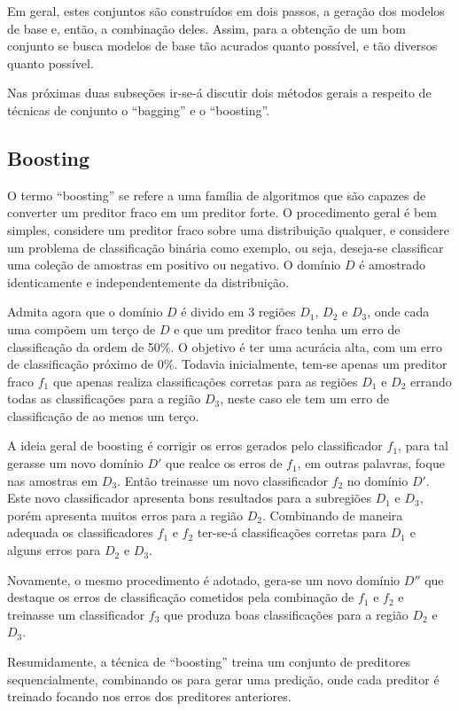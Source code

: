 Em geral, estes conjuntos são construídos em dois passos, a geração dos modelos de base e, então, a combinação deles. Assim, para a obtenção de um bom conjunto se busca modelos de base tão acurados quanto possível, e tão diversos quanto possível.

Nas próximas duas subseções ir-se-á discutir dois métodos gerais a respeito de técnicas de conjunto o ``bagging'' e o ``boosting''.

\subsection{Boosting}

O termo ``boosting'' se refere a uma família de algoritmos que são capazes de converter um preditor fraco em um preditor forte. O procedimento geral é bem simples, considere um preditor fraco sobre uma distribuição qualquer, e considere um problema de classificação binária como exemplo, ou seja, deseja-se classificar uma coleção de amostras em positivo ou negativo. O domínio $D$ é amostrado identicamente e independentemente da distribuição.

Admita agora que o domínio $D$ é divido em 3 regiões $D_1$, $D_2$ e $D_3$, onde cada uma compõem um terço de $D$ e que um preditor fraco tenha um erro de classificação da ordem de 50\%. O objetivo é ter uma acurácia alta, com um erro de classificação próximo de 0\%. Todavia inicialmente, tem-se apenas um preditor fraco $f_1$ que apenas realiza classificações corretas para as regiões $D_1$ e $D_2$ errando todas as classificações para a região $D_3$, neste caso ele tem um erro de classificação de ao menos um terço.

A ideia geral de boosting é corrigir os erros gerados pelo classificador $f_1$, para tal gerasse um novo domínio $D'$ que realce os erros de $f_1$, em outras palavras, foque nas amostras em $D_3$. Então treinasse um novo classificador $f_2$  no domínio $D'$. Este novo classificador apresenta bons resultados para a subregiões $D_1$ e $D_3$, porém apresenta muitos erros para a região $D_2$. Combinando de maneira adequada os classificadores $f_1$ e $f_2$ ter-se-á classificações corretas para $D_1$ e alguns erros para $D_2$ e $D_3$.

Novamente, o mesmo procedimento é adotado, gera-se um novo domínio $D''$ que destaque os erros de classificação cometidos pela combinação de $f_1$ e $f_2$ e treinasse um classificador $f_3$ que produza boas classificações para a região $D_2$ e $D_3$.

Resumidamente, a técnica de ``boosting'' treina um conjunto de preditores sequencialmente, combinando os para gerar uma predição, onde cada preditor é treinado focando nos erros dos preditores anteriores.

